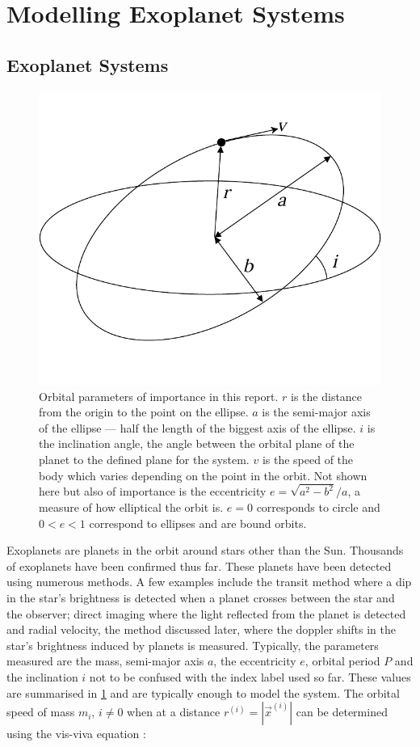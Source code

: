 \documentclass{physics_article_B}
\begin{document}
\section{Modelling Exoplanet Systems}

\subsection{Exoplanet Systems}

\begin{figure}[h]
 \centering
 \includegraphics[width=0.7\linewidth]{orbitalparams.pdf}
 \caption{Orbital parameters of importance in this report. $r$ is the distance from the origin to the point on the ellipse. $a$ is the semi-major axis of the ellipse --- half the length of the biggest axis of the ellipse. $i$ is the inclination angle, the angle between the orbital plane of the planet to the defined plane for the system. $v$ is the speed of the body which varies depending on the point in the orbit. Not shown here but also of importance is the eccentricity $e = \sqrt{a^2 - b^2} / a$, a measure of how elliptical the orbit is. $e = 0$ corresponds to circle and $0 < e < 1$ correspond to ellipses and are bound orbits. }
 \label{fig:orbitparams}
\end{figure}

Exoplanets are planets in the orbit around stars other than the Sun. Thousands of exoplanets have been confirmed thus far. These planets have been detected using numerous methods. A few examples include the transit method where a dip in the star's brightness is detected when a planet crosses between the star and the observer; direct imaging where the light reflected from the planet is detected and radial velocity, the method discussed later, where the doppler shifts in the star's brightness induced by planets is measured. Typically, the parameters measured are the mass, semi-major axis $a$, the eccentricity $e$, orbital period $P$ and the inclination $i$ not to be confused with the index label used so far. These values are summarised in \cref{fig:orbitparams} and are typically enough to model the system. The orbital speed of mass $m_i$, $i\neq 0$ when at a distance $r^{(i)} = |\vec{x}^{(i)}|$ can be determined using the vis-viva equation \cite{lissauer_fundamental_2014}:
\end{document}
